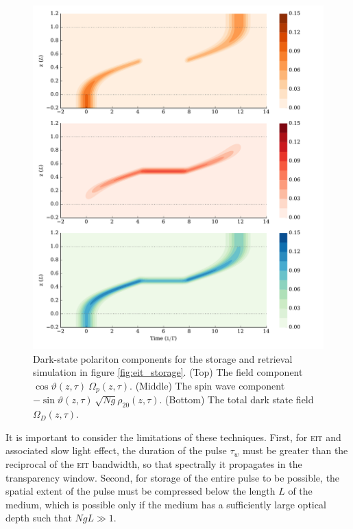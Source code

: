     \begin{figure}[]
      \includegraphics[width=\linewidth]
        {figs/04_polaritons/pls_p0_2pi_t1_Ng5e3_c10_gaussian_w0_5_storage_5_fig4.pdf}
      \caption{
      Dark-state polariton components for the storage and retrieval simulation
      in figure \ref{fig:eit_storage}. (Top) The field component
      $\cos{\vartheta}(z, \tau)~\Omega_p(z, \tau)$. (Middle) The spin wave
      component $-\sin{\vartheta}(z, \tau) ~ \sqrt{Ng} \rho_{20}(z, \tau)$.
      (Bottom) The total dark state field $\Omega_D(z,\tau)$.
      }
      \label{fig:dark_state_components}
    \end{figure}



    It is important to consider the limitations of these techniques. First, for
    \textsc{eit} and associated slow light effect, the duration of the pulse
    $\tau_w$ must be greater than the reciprocal of the \textsc{eit} bandwidth,
    so that spectrally it propagates in the transparency   window. Second, for
    storage of the entire pulse to be possible, the spatial extent of the pulse
    must be compressed below the length $L$ of the medium, which is possible
    only if the medium has a sufficiently large optical depth such that $Ng L
    \gg 1$.\cite{Fleischhauer2005}

